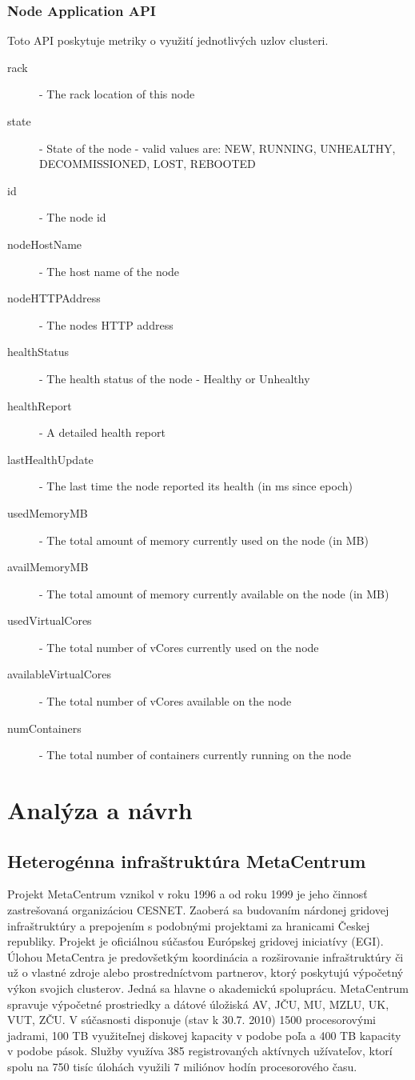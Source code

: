 \documentclass[11pt,final,oneside]{fithesis}
\begin{document}
\subsection{Node Application API}
Toto API poskytuje metriky o využití jednotlivých uzlov clusteri.
\begin{description}
\item[rack] - The rack location of this node
\item[state] - State of the node - valid values are: NEW, RUNNING, UNHEALTHY, DECOMMISSIONED, LOST, REBOOTED
\item[id] - The node id
\item[nodeHostName] - The host name of the node
\item[nodeHTTPAddress] - The nodes HTTP address
\item[healthStatus] - The health status of the node - Healthy or Unhealthy
\item[healthReport] - A detailed health report
\item[lastHealthUpdate] - The last time the node reported its health (in ms since epoch)
\item[usedMemoryMB] - The total amount of memory currently used on the node (in MB)
\item[availMemoryMB] - The total amount of memory currently available on the node (in MB)
\item[usedVirtualCores] - The total number of vCores currently used on the node
\item[availableVirtualCores] - The total number of vCores available on the node
\item[numContainers] - The total number of containers currently running on the node
\end{description}

\chapter{Analýza a návrh}
\section{Heterogénna infraštruktúra MetaCentrum}
Projekt MetaCentrum vznikol v roku 1996 a od roku 1999 je jeho činnosť zastrešovaná organizáciou CESNET. Zaoberá sa budovaním nárdonej gridovej infraštruktúry a prepojením s podobnými projektami za hranicami
Českej republiky. Projekt je oficiálnou súčasťou Európskej gridovej iniciatívy (EGI). Úlohou MetaCentra je predovšetkým koordinácia a rozširovanie infraštruktúry či už o vlastné zdroje alebo prostredníctvom
partnerov, ktorý poskytujú výpočetný výkon svojich clusterov. Jedná sa hlavne o akademickú spoluprácu. MetaCentrum spravuje výpočetné prostriedky a dátové úložiská AV, JČU, MU, MZLU, UK, VUT, ZČU.
V súčasnosti disponuje (stav k 30.7. 2010) 1500 procesorovými jadrami, 100 TB využiteľnej diskovej kapacity v podobe poľa a 400 TB kapacity v podobe pások. Služby využíva 385 registrovaných aktívnych užívateľov, ktorí 
spolu na 750 tisíc úlohách využili 7 miliónov hodín procesorového času.
\end{document}
